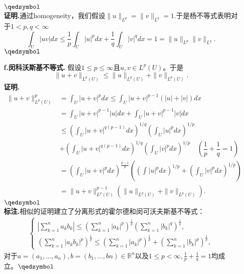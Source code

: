 \documentclass[leqno]{article}%
\begin{document}
\begin{enumerate}[fullwidth,itemindent=0em]
 $\hfill\qedsymbol$\\
\textbf{证明.}通过homogeneity，我们假设$\|u\|_{L^{p}}=\|v\|_{L^{q}}=1.$于是杨不等式表明对于$1<p,q<\infty$
\begin{equation*}
\int_{U}|uv|dx\leq\dfrac{1}{p}\int_{U}|u|^{p}dx+\dfrac{1}{q}\int_{U}|v|^{q}dx=1=\|u\|_{L^{p}}\|v\|_{L^{q}}.
\end{equation*}
$\hfill\qedsymbol$
\item[\textbf{f.闵科沃斯基不等式.}]假设$1\leq p\leq\infty$且$u,v\in L^{p}(U)$。于是
\begin{equation}
\|u+v\|_{L^{p}(U)}\leq \|u\|_{L^{p}(U)}+\|v\|_{L^{p}(U)}.
\end{equation}
\textbf{证明.}
\begin{align*}
\|u+v\|_{L^{p}(U)}^{p}&=\int_{U}|u+v|^{p}dx\leq\int_{U}|u+v|^{p-1}(|u|+|v|)dx\\
                      &=\int_{U}|u+v|^{p-1}|u|dx+\int_{U}|u+v|^{p-1}|v|dx\\
                      &\leq\left(\int_{U}|u+v|^{q(p-1)}dx\right)^{1/q}\left(\int_{U}|u|^{p}dx\right)^{1/p}\\
                      &+\left(\int_{U}|u+v|^{q(p-1)}dx\right)^{1/q}\left(\int_{U}|v|^{p}dx\right)^{1/p}\quad (\dfrac{1}{p}+\dfrac{1}{q}=1)\\
                      &=\left(\int_{U}|u+v|^{p}dx\right)^{\frac{p-1}{p}}\left(\left(\int|u|^{p}dx\right)^{1/p}+\left( \int_{U}|v|^{p}dx\right)^{1/p}\right)\\
                      &=\|u+v\|_{L^{p}(U)}^{p-1}(\|u\|_{L^{p}(U)}+\|v\|_{L^{p}(U)}).
\end{align*}
 $\hfill\qedsymbol$\\
\textbf{标注.}相似的证明建立了分离形式的霍尔德和闵可沃夫斯基不等式：
\begin{equation}
\begin{aligned}
\begin{cases}
|\sum_{k=1}^{n}a_{k}b_{k}|\leq\left(\sum_{k=1}^{n}|a_{k}|^{p}\right)^{\frac{1}{p}}\left(\sum_{k=1}^{n}|b_{k}|^{q}\right)^{\frac{1}{q}},\\
\left(\sum_{k=1}^{n}|a_{k}b_{k}|^{p}\right)^{\frac{1}{p}}\leq\left(\sum_{k=1}^{n}|a_{k}|^{p}\right)^{\frac{1}{p}}+\left(\sum_{k=1}^{n}|b_{k}|^{p}\right)^{\frac{1}{p}},
\end{cases}
\end{aligned}
\end{equation}
对于$a=(a_{1},...,a_{n}),b=(b_{1},...,b{n})\in\mathbb{R}^{n}$以及$1\leq p <\infty,\frac{1}{p}+\frac{1}{q}=1$均成立。$\hfill\qedsymbol$

\end{enumerate}
\end{document}
